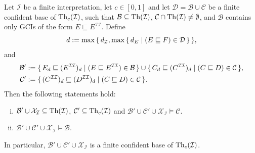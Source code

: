 \begin{Theorem}
  \label{thm:unravelling-confident-bases}
  Let $\mathcal{I}$ be a finite interpretation, let $c \in [0,1]$ and let $\mathcal{D} =
  \mathcal{B} \cup \mathcal{C}$ be a finite confident base of $\operatorname{Th}_c(\mathcal{I})$, such
  that $\mathcal{B} \subseteq \operatorname{Th}(\mathcal{I})$, $\mathcal{C} \cap \operatorname{Th}(\mathcal{I}) \neq
  \emptyset$, and $\mathcal{B}$ contains only GCIs of the form $E \sqsubseteq
  E^{\mathcal{I}\mathcal{I}}$. Define
  \begin{equation*}
    d := \max{\ensuremath{\{\, d_{\mathcal{I}}, \max {\ensuremath{\{\, d_{E} \mid (E \sqsubseteq F) \in
        \mathcal{D} \,\}}} \,\}}},
  \end{equation*}
  and
  \begin{align*}
    \mathcal{B}' &:= {\{\, E_{d} \sqsubseteq (E^{\mathcal{I}\mathcal{I}})_{d} \mid (E
      \sqsubseteq E^{\mathcal{I}\mathcal{I}}) \in \mathcal{B} \,\}} \cup {\ensuremath{\{\, C_{d}
      \sqsubseteq (C^{\mathcal{I}\mathcal{I}})_{d}\mid (C \sqsubseteq D) \in \mathcal{C} \,\}}},\\
    \mathcal{C}' &:= {\{\, (C^{\mathcal{I}\mathcal{I}})_{d} \sqsubseteq
      (D^{\mathcal{I}\mathcal{I}})_{d} \mid (C \sqsubseteq D) \in \mathcal{C} \,\}}.
  \end{align*}
  Then the following statements hold:
  \begin{enumerate}[i. ]
  \item $\mathcal{B}' \cup \mathcal{X}_{\mathcal{I}} \subseteq \operatorname{Th}(\mathcal{I})$,
    $\mathcal{C}' \subseteq \operatorname{Th}_c(\mathcal{I})$ and $\mathcal{B}' \cup \mathcal{C}' \cup
    \mathcal{X}_{\mathcal{I}} \models \mathcal{C}$.
  \item $\mathcal{B}' \cup \mathcal{C}' \cup \mathcal{X}_{\mathcal{I}} \models
    \mathcal{B}$.
  \end{enumerate}
  In particular, $\mathcal{B}' \cup \mathcal{C}' \cup \mathcal{X}_{\mathcal{I}}$ is a
  finite confident \ELbot base of $\operatorname{Th}_c(\mathcal{I})$.
\end{Theorem}

